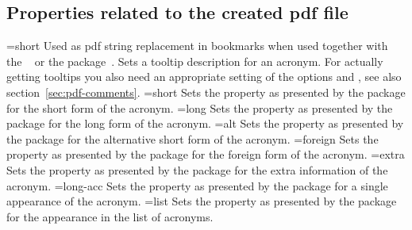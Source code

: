 \documentclass{acro-manual}
\begin{document}
\subsection{Properties related to the created \acs*{pdf} file}\label{sec:prop-relat-creat}
\begin{properties}
  \Default={short}
    Used as \acs{pdf} string replacement in bookmarks when used together with
    the ~\cite{pkg:hyperref} or the 
    package~\cite{pkg:bookmark}.
    Sets a tooltip description for an acronym.  For actually getting
    tooltips you also need an appropriate setting of the options
     and , see also
    section~\vref{sec:pdf-comments}.
  \Default={short}
    Sets the  property as presented by the 
    package for the short form of the acronym.
  \Default={long}
    Sets the  property as presented by the 
    package for the long form of the acronym.
  \Default={alt}
    Sets the  property as presented by the 
    package for the alternative short form of the acronym.
  \Default={foreign}
    Sets the  property as presented by the 
    package for the foreign form of the acronym.
  \Default={extra}
    Sets the  property as presented by the 
    package for the extra information of the acronym.
  \Default={long-acc}
    Sets the  property as presented by the 
    package for a single appearance of the acronym.
  \Default={list}
    Sets the  property as presented by the 
    package for the appearance in the list of acronyms.
\end{properties}
\end{document}
